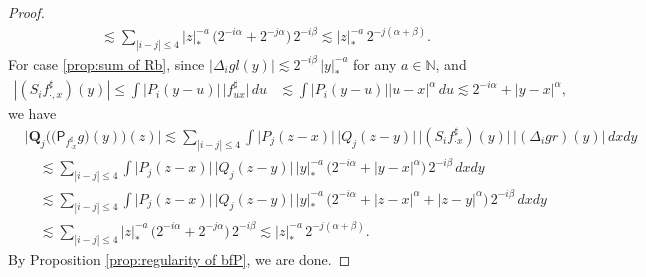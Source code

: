 \documentclass[10pt]{amsart}
\theoremstyle{plain}
\theoremstyle{definition}
\newcommand{\bfQ}{\mathbf{Q}}
\newcommand{\sfP}{\mathsf{P}}
\newcommand{\bbN}{\mathbb{N}}
\begin{document}
\begin{proof}
\begin{align*}
&\lesssim\sum_{|i-j|\le4}|z|_*^{-a} \,\bigl(2^{-i\alpha} + 2^{-j\alpha}\bigr)\,2^{-i\beta} \lesssim |z|_*^{-a}\,2^{-j(\alpha+\beta)}.
\end{align*}
For case \eqref{prop:sum of Rb}, since $\big|\Delta_igl(y)\big| \lesssim 2^{-i\beta}\,|y|_*^{-a}$ for any $a\in\bbN$, and
\begin{align*}
|(S_if_{\cdot,x}^\sharp)(y)|\le
\int \big|P_i(y-u)\big|\,\big|f_{ux}^\sharp\big|\,du &\lesssim\int \big|P_i(y-u)\big| |u-x|^\alpha\,du \lesssim 2^{-i\alpha}+|y-x|^\alpha,
\end{align*}
we have
\begin{align*}
&\Big|\bfQ_j\bigl(\bigl(\sfP_{f_{\cdot x}^\sharp}g\bigr)(y)\bigr)(z)\Big|
\lesssim \sum_{|i-j|\le4} \int \big|P_j(z-x)\big|\, \big|Q_j(z-y)\big| \,\big| (S_if_{\cdot x}^\sharp)(y)\big| \,\big|(\Delta_igr)(y)\big|\,dxdy \\
&\quad\lesssim \sum_{|i-j|\le4} \int \big|P_j(z-x)\big| \,\big|Q_j(z-y)\big| \,|y|_*^{-a} \,\bigl(2^{-i\alpha} + |y-x|^\alpha\bigr)\,2^{-i\beta}\,dxdy\\
&\quad\lesssim \sum_{|i-j|\le4} \int \big|P_j(z-x)\big|\,\big|Q_j(z-y)\big|\, |y|_*^{-a} \,\bigl(2^{-i\alpha} + |z-x|^\alpha+|z-y|^\alpha\bigr)\,2^{-i\beta}\,dxdy \\
&\quad\lesssim \sum_{|i-j|\le4} |z|_*^{-a} \,\bigl(2^{-i\alpha}+2^{-j\alpha}\bigr) \,2^{-i\beta} \lesssim |z|_*^{-a}\,2^{-j(\alpha+\beta)}.
\end{align*}
By Proposition \ref{prop:regularity of bfP}, we are done.
\end{proof}
\end{document}
